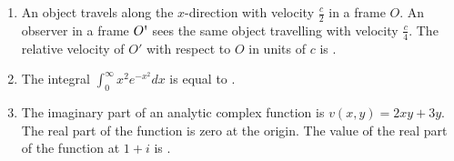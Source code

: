 \documentclass{article}
\newcommand{\brak}[1]{\left( #1 \right)}
\renewcommand{\prime}{\text{\textquotesingle}}
\begin{document}
\begin{enumerate}
\item An object travels along the $x$-direction with velocity $\frac{c}{2}$ in a frame $O$. An observer in a frame $O \prime$ sees the same object travelling with velocity $\frac{c}{4}$. The relative velocity of $O'$ with respect to $O$ in units of $c$ is  .

 \item The integral $\int_{0}^{\infty} x^2 e^{-x^2} dx$ is equal to  .

 \item The imaginary part of an analytic complex function is $v\brak{x,y} = 2xy + 3y$. The real part of the function is zero at the origin. The value of the real part of the function at $1 + i$ is .

\end{enumerate}
\end{document}
